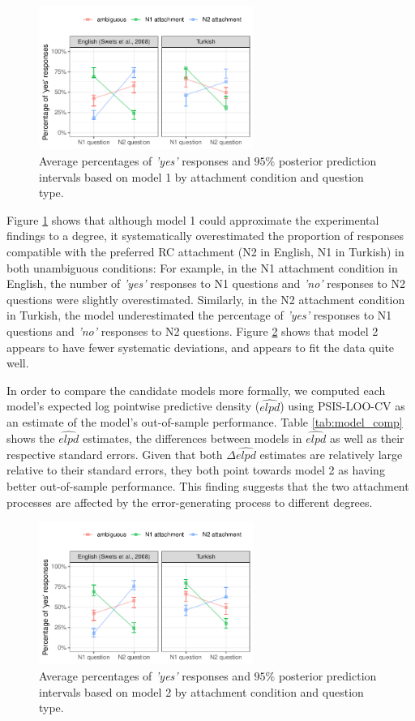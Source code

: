 \documentclass[11pt]{article}\usepackage[]{graphicx}\usepackage[]{color}
\begin{document}
\begin{figure}
\includegraphics[width=7cm]{../figures/post_pred_ahg.pdf}
\caption{Average percentages of \textit{'yes'} responses and $95\%$ posterior prediction intervals based on model 1 by attachment condition and question type.}
\label{post_pred_ahg}
\end{figure}


Figure \ref{post_pred_ahg} shows that although model 1 could approximate the experimental findings to a degree, it systematically overestimated the proportion of responses compatible with the preferred RC attachment (N2 in English, N1 in Turkish) in both unambiguous conditions: For example, in the N1 attachment condition in English, the number of \textit{'yes'} responses to N1 questions and \textit{'no'} responses to N2 questions were slightly overestimated. Similarly, in the N2 attachment condition in Turkish, the model underestimated the percentage of \textit{'yes'} responses to N1 questions and \textit{'no'} responses to N2 questions.  Figure \ref{post_pred_r1r2hg} shows that model 2 appears to have fewer systematic deviations, and appears to fit the data quite well.

In order to compare the candidate models more formally, we computed each model's expected log pointwise predictive density ($\widehat{elpd}$) using PSIS-LOO-CV \citep{loo} as an estimate of the model's out-of-sample performance. Table \ref{tab:model_comp} shows the $\widehat{elpd}$ estimates, the differences between models in $\widehat{elpd}$ as well as their respective standard errors. Given that both $\Delta\widehat{elpd}$ estimates are relatively large relative to their standard errors, they both point towards model 2 as having better out-of-sample performance.
This finding suggests that the two attachment processes are affected by the error-generating process to different degrees.



\begin{figure}
\includegraphics[width=7cm]{../figures/post_pred_r1r2hg.pdf}
\caption{Average percentages of \textit{'yes'} responses and $95\%$ posterior prediction intervals based on model 2 by attachment condition and question type.}
\label{post_pred_r1r2hg}
\end{figure}
\end{document}
